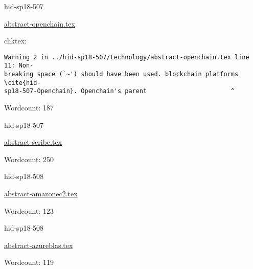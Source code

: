 

\begin{IU}

hid-sp18-507

\href{https://github.com/cloudmesh-community/hid-sp18-507/blob/master//technology/abstract-openchain.tex}{abstract-openchain.tex}

 
chktex:
\begin{tiny}
\begin{verbatim}
Warning 2 in ../hid-sp18-507/technology/abstract-openchain.tex line 11: Non-
breaking space (`~') should have been used. blockchain platforms \cite{hid-
sp18-507-Openchain}. Openchain's parent                       ^
\end{verbatim}
\end{tiny}

Wordcount: 187

\end{IU}



\begin{IU}

hid-sp18-507

\href{https://github.com/cloudmesh-community/hid-sp18-507/blob/master//technology/abstract-scribe.tex}{abstract-scribe.tex}

 

Wordcount: 250

\end{IU}



\begin{IU}

hid-sp18-508

\href{https://github.com/cloudmesh-community/hid-sp18-508/blob/master//technology/abstract-amazonec2.tex}{abstract-amazonec2.tex}

 

Wordcount: 123

\end{IU}



\begin{IU}

hid-sp18-508

\href{https://github.com/cloudmesh-community/hid-sp18-508/blob/master//technology/abstract-azureblas.tex}{abstract-azureblas.tex}

 

Wordcount: 119

\end{IU}

